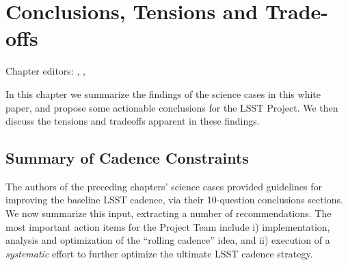 \chapter[Conclusions, Tensions and Trade-offs]{Conclusions, Tensions and Trade-offs}
\def\chpname{tradeoffs}\label{chp:\chpname}

Chapter editors:
,
,


In this chapter we summarize the findings of the science cases in this
white paper, and propose some actionable conclusions for the LSST Project.
We then discuss the tensions and tradeoffs apparent in these findings.


\section{Summary of Cadence Constraints}


The authors of the preceding chapters' science cases provided guidelines
for improving the baseline LSST cadence, via their 10-question
conclusions sections.  We now summarize this input, extracting a number
of recommendations. The most important action
items for the Project Team include i) implementation, analysis and
optimization of the ``rolling cadence'' idea, and ii) execution of a
{\it systematic} effort to further optimize the ultimate LSST cadence
strategy.

